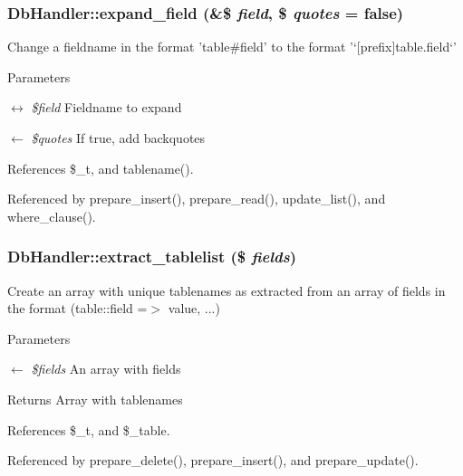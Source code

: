 \subsubsection[{expand\_\-field}]{\setlength{\rightskip}{0pt plus 5cm}DbHandler::expand\_\-field (\&\$ {\em field}, \/  \$ {\em quotes} = {\ttfamily false})}\label{classDbHandler_a7896419cf143412ad74ca8fccb11fb6e}
Change a fieldname in the format 'table\#field' to the format '`\mbox{[}prefix\mbox{]}table.field`' 
\begin{DoxyParams}{Parameters}
\item[\mbox{$\leftrightarrow$} {\em \$field}]Fieldname to expand \item[\mbox{$\leftarrow$} {\em \$quotes}]If true, add backquotes \end{DoxyParams}


References \$\_\-t, and tablename().



Referenced by prepare\_\-insert(), prepare\_\-read(), update\_\-list(), and where\_\-clause().

\subsubsection[{extract\_\-tablelist}]{\setlength{\rightskip}{0pt plus 5cm}DbHandler::extract\_\-tablelist (\$ {\em fields})}\label{classDbHandler_af7a315d2a47dc9f2d2f897ca87981c00}
Create an array with unique tablenames as extracted from an array of fields in the format (table::field =$>$ value, ...) 
\begin{DoxyParams}{Parameters}
\item[\mbox{$\leftarrow$} {\em \$fields}]An array with fields \end{DoxyParams}
\begin{DoxyReturn}{Returns}
Array with tablenames 
\end{DoxyReturn}


References \$\_\-t, and \$\_\-table.



Referenced by prepare\_\-delete(), prepare\_\-insert(), and prepare\_\-update().

